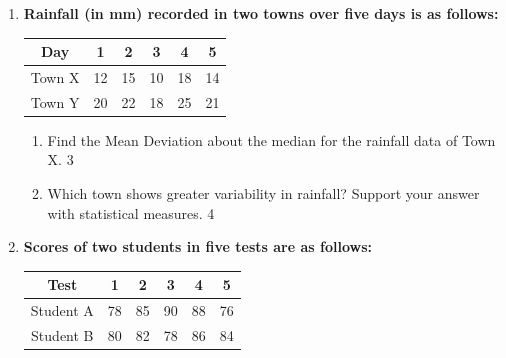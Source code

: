 \documentclass[a4paper,oneside]{book}
\begin{document}
\begin{enumerate}
    \begin{center}

    City A: 2, 1, -1, 0, 3

    City B: 3, 0, -2, 2, 3
    
    \end{center}
  \begin{enumerate}
    \item
	What is standard deviation? \hfill 1
    \item
	Is standard deviation of a set of negative values negative? Justify mathematically. \hfill 2
    \item  
	Find Mean Deviation about mean of the values of city A.  \hfill 3
    \item
	Which city has more consistent weather? Verify statistically. \hfill 4
\end{enumerate}

\item  
  \textbf{Rainfall (in mm) recorded in two towns over five days is as follows:}

\begin{table}[h]
\centering
\begin{tabular}{c|ccccc}
Day     & 1  & 2  & 3  & 4  & 5  \\ \hline
Town X  & 12 & 15 & 10 & 18 & 14 \\
Town Y  & 20 & 22 & 18 & 25 & 21
\end{tabular}
\end{table}


  \begin{enumerate}
    \item  
	Find the Mean Deviation about the median for the rainfall data of Town X.  \hfill 3  
    \item  
	Which town shows greater variability in rainfall? Support your answer with statistical measures.  \hfill 4  
\end{enumerate}

\item  
  \textbf{Scores of two students in five tests are as follows:}

\begin{table}[h]
\centering
\begin{tabular}{c|ccccc}
Test     & 1  & 2  & 3  & 4  & 5  \\ \hline
Student A  & 78 & 85 & 90 & 88 & 76 \\ 
Student B  & 80 & 82 & 78 & 86 & 84
\end{tabular}
\end{table}


\end{enumerate}
\end{document}
